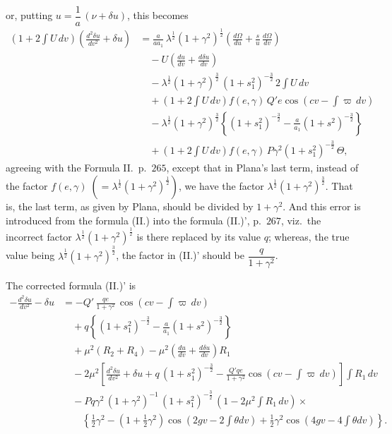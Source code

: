 \documentclass[11pt]{article}
\begin{document}
or, putting $u = \dfrac{1}{a}\,(\nu + \delta u)$, this becomes
\begin{align*}
\left(1 + 2\!\int\!U\,dv\right)\!\left(\frac{d^{2}\delta u}{dv^{2}} + \delta u\right)
&= \frac{a}{a a_{1}}\,\lambda^{\frac{1}{2}}(1+\gamma^{2})^{\frac{1}{2}}
\left(\frac{d\Omega}{du} + \frac{s}{u}\,\frac{d\Omega}{dv}\right) \\
&\quad - U\!\left(\frac{du}{dv} + \frac{d\delta u}{dv}\right) \\
&\quad - \lambda^{\frac{1}{2}}(1+\gamma^{2})^{\frac{3}{2}}\,(1+s_{1}^{2})^{-\frac{3}{2}}\, 2\!\int\!U\,dv \\
&\quad + \left(1 + 2\!\int\!U\,dv\right) f(e,\gamma)\, Q'e\cos\!\left(cv - \int\!\varpi\,dv\right) \\
&\quad - \lambda^{\frac{1}{2}}(1+\gamma^{2})^{\frac{3}{2}}
\left\{(1+s_{1}^{2})^{-\frac{3}{2}} - \frac{a}{a_{1}}(1+s^{2})^{-\frac{3}{2}}\right\} \\
&\quad + \left(1 + 2\!\int\!U\,dv\right) f(e,\gamma)\, P\gamma^{2}(1+s_{1}^{2})^{-\frac{3}{2}}\,\Theta,
\end{align*}
agreeing with the Formula II.\ p.\ $265$, except that in Plana's last
term, instead of the factor $f(e,\gamma)\;(=\lambda^{\frac{1}{2}}(1+\gamma^{2})^{\frac{1}{2}})$,
we have the factor $\lambda^{\frac{1}{2}}(1+\gamma^{2})^{\frac{3}{2}}$. That is, the last
term, as given by Plana, should be divided by $1 + \gamma^{2}$. And this
error is introduced from the formula (II.) into the formula (II.)',
p.\ $267$, viz.\ the incorrect factor $\lambda^{\frac{1}{2}}(1+\gamma^{2})^{\frac{1}{2}}$
is there replaced by its value $q$; whereas, the true value being
$\lambda^{\frac{1}{2}}(1+\gamma^{2})^{\frac{3}{2}}$, the factor in (II.)' should be
$\dfrac{q}{1+\gamma^{2}}$.

The corrected formula (II.)' is
\begin{align*}
- \frac{d^{2}\delta u}{dv^{2}} - \delta u
&= - Q'\,\frac{qe}{1+\gamma^{2}}\,\cos\!\left(cv - \int\!\varpi\,dv\right) \\
&\quad + q\left\{(1+s_{1}^{2})^{-\frac{3}{2}} - \frac{a}{a_{1}}(1+s^{2})^{-\frac{3}{2}}\right\} \\
&\quad + \mu^{2}(R_{2} + R_{4}) - \mu^{2}\!\left(\frac{du}{dv} + \frac{d\delta u}{dv}\right) R_{1} \\
&\quad - 2\mu^{2}\!\left[\frac{d^{2}\delta u}{dv^{2}} + \delta u
   + q\,(1+s_{1}^{2})^{-\frac{3}{2}} - \frac{Q'qe}{1+\gamma^{2}}\cos\!\left(cv - \int\!\varpi\,dv\right)\right]\!\int R_{1}\,dv \\
&\quad - P q \gamma^{2}\,(1+\gamma^{2})^{-1}\,(1+s_{1}^{2})^{-\frac{3}{2}}\,(1 - 2\mu^{2}\!\int\!R_{1}\,dv)\times \\
&\qquad \left\{\tfrac{1}{2}\gamma^{2} - (1 + \tfrac{1}{2}\gamma^{2})\cos(2gv - 2\!\int\!\theta dv)
   + \tfrac{1}{2}\gamma^{2}\cos(4gv - 4\!\int\!\theta dv)\right\}.
\end{align*}
\end{document}
